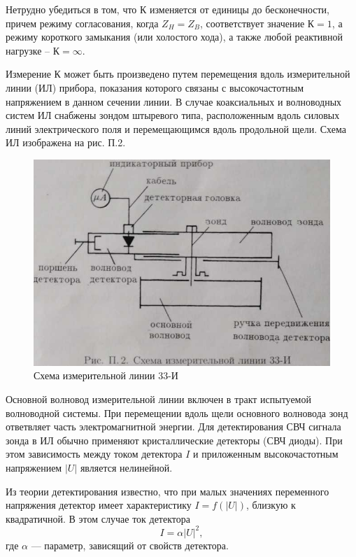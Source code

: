 ﻿\documentclass[a4paper,11pt]{article}
\begin{document}
Нетрудно убедиться в том, что К изменяется от единицы до бесконечности, причем режиму согласования, когда $Z_H = Z_B$, соответствует значение $\mathrm{К}=1$, а режиму короткого замыкания (или холостого хода), а также любой реактивной нагрузке -- $\mathrm{К}=\infty$.

Измерение К может быть произведено путем перемещения вдоль измерительной линии (ИЛ) прибора, показания которого связаны с высокочастотным напряжением в данном сечении линии. 
В случае коаксиальных и волноводных систем ИЛ снабжены зондом штыревого типа, расположенным вдоль силовых линий электрического поля и перемещающимся вдоль продольной щели. 
Схема ИЛ изображена на рис. П.2.
\begin{figure}[h!]
	\centering
	\includegraphics{img/3.jpg}
	\caption{Схема измерительной линии 33-И}
	\label{fig:figure1}
\end{figure}

Основной волновод измерительной линии включен в тракт испытуемой волноводной системы. 
При перемещении вдоль щели основного волновода зонд ответвляет часть электромагнитной энергии. 
Для детектирования СВЧ сигнала зонда в ИЛ обычно применяют кристаллические детекторы (СВЧ диоды). 
При этом зависимость между током детектора $I$ и приложенным высокочастотным напряжением $|U|$ является нелинейной.

Из теории детектирования известно, что при малых значениях переменного напряжения детектор имеет характеристику $I=f(|U|)$, близкую к квадратичной. В этом случае ток детектора
\begin{equation}
	I=\alpha|U|^2,
\end{equation}
где $\alpha$ --- параметр, зависящий от свойств детектора.
\end{document}

